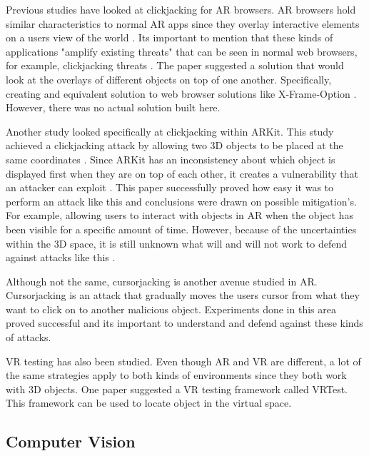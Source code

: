 \documentclass[conference]{IEEEtran}
\begin{document}
Previous studies have looked at clickjacking for AR browsers. AR browsers hold similar characteristics to normal AR apps since they overlay interactive elements on a users view of the world \cite{mcpherson_no_2015}. Its important to mention that these kinds of applications "amplify existing threats" that can be seen in normal web browsers, for example, clickjacking threats \cite{mcpherson_no_2015}. The paper suggested a solution that would look at the overlays of different objects on top of one another\cite{mcpherson_no_2015}. Specifically, creating and equivalent solution to web browser solutions like X-Frame-Option \cite{mcpherson_no_2015}. However, there was no actual solution built here. 

Another study looked specifically at clickjacking within ARKit. This study achieved a clickjacking attack by allowing two 3D objects to be placed at the same coordinates \cite{cheng_when_nodate}. Since ARKit has an inconsistency about which object is displayed first when they are on top of each other, it creates a vulnerability that an attacker can exploit \cite{cheng_when_nodate}. This paper successfully proved how easy it was to perform an attack like this and conclusions were drawn on possible mitigation's. For example, allowing users to interact with objects in AR when the object has been visible for a specific amount of time\cite{cheng_when_nodate}. However, because of the uncertainties within the 3D space, it is still unknown what will and will not work to defend against attacks like this \cite{cheng_when_nodate}.

Although not the same, cursorjacking is another avenue studied in AR. Cursorjacking is an attack that gradually moves the users cursor from what they want to click on to another malicious object\cite{su_perception_2022}. Experiments done in this area proved successful and its important to understand and defend against these kinds of attacks.

VR testing has also been studied. Even though AR and VR are different, a lot of the same strategies apply to both kinds of environments since they both work with 3D objects. One paper suggested a VR testing framework called VRTest\cite{wang_vrtest_2022}. This framework can be used to locate object in the virtual space\cite{wang_vrtest_2022}. 

\subsection{Computer Vision}
\end{document}
